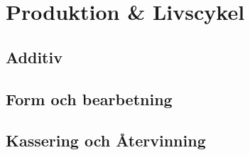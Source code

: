 \section{Produktion \& Livscykel}
\subsection{Additiv}
\subsection{Form och bearbetning}
\subsection{Kassering och Återvinning}